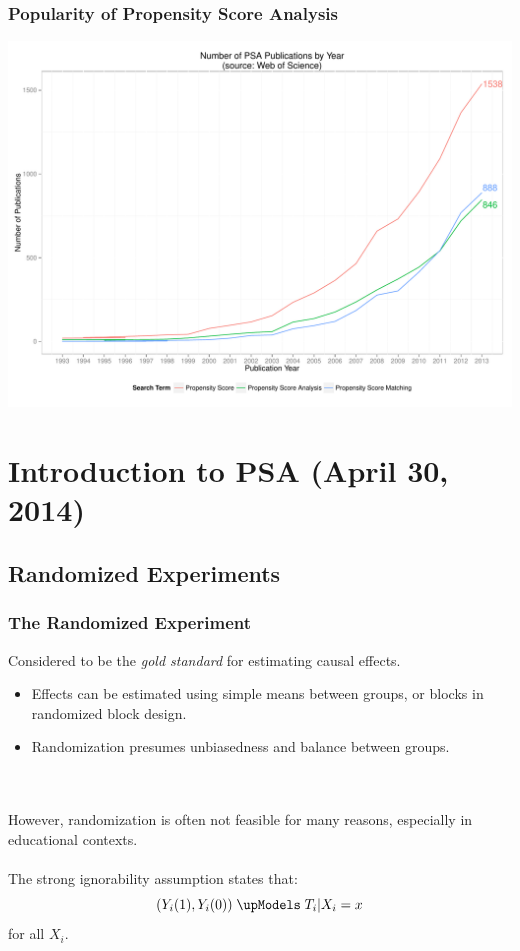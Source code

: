 \documentclass[10pt,slidestop,mathserif,c]{beamer}
\begin{document}
\begin{frame}
    \frametitle{Popularity of Propensity Score Analysis}
    \begin{center}
        \includegraphics{figures/Slides-popularity}
    \end{center}
    

\end{frame}


\section{Introduction to PSA (April 30, 2014)}

\subsection{Randomized Experiments}

\begin{frame}
    \frametitle{The Randomized Experiment}
    
    Considered to be the \textit{gold standard} for estimating causal effects.
    
    \begin{itemize}
        \item Effects can be estimated using simple means between groups, or blocks in randomized block design.
        \item Randomization presumes unbiasedness and balance between groups.
    \end{itemize}
    \ \\ \ \\
    However, randomization is often not feasible for many reasons, especially in educational contexts.
    \pause
    \ \\ \ \\
    The strong ignorability assumption states that:
    $$({ Y }_{ i }(1),{ Y }_{ i }(0)) \; \upModels \; { T }_{ i }|{ X }_{ i }=x$$
    for all ${X}_{i}$.
    
\end{frame}
\end{document}
